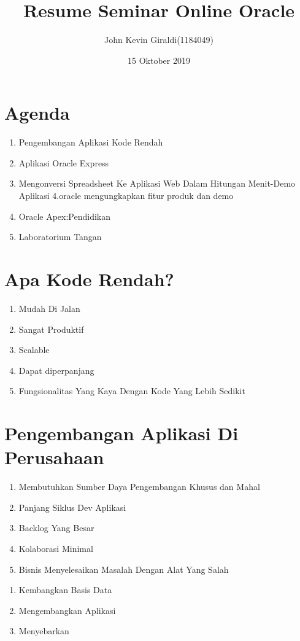 \documentclass{article}
\title{Resume Seminar Online Oracle}
\author{John Kevin Giraldi(1184049)}
\date{15 Oktober 2019}
\begin{document}
\maketitle

\section{Agenda}
\begin{enumerate}
    \item Pengembangan Aplikasi Kode Rendah 
    \item Aplikasi Oracle Express
    \item Mengonversi Spreadsheet Ke Aplikasi Web Dalam Hitungan Menit-Demo Aplikasi 4.oracle mengungkapkan fitur produk dan demo
    \item Oracle Apex:Pendidikan
    \item Laboratorium Tangan
\end{enumerate}

\section{Apa Kode Rendah?}
\begin{enumerate}
    \item Mudah Di Jalan
    \item Sangat Produktif
    \item Scalable
    \item Dapat diperpanjang
    \item Fungsionalitas Yang Kaya Dengan Kode Yang Lebih Sedikit
\end{enumerate}
\section{Pengembangan Aplikasi Di Perusahaan}
\begin{enumerate}
    \item Membutuhkan Sumber Daya Pengembangan Khusus dan Mahal
    \item Panjang Siklus Dev Aplikasi
    \item Backlog Yang Besar
    \item Kolaborasi Minimal
    \item Bisnis Menyelesaikan Masalah Dengan Alat Yang Salah
    
\end{enumerate}

\usepackage{Oracle Apex :}
\begin{enumerate}

    \item Kembangkan Basis Data
    \item Mengembangkan Aplikasi
    \item Menyebarkan
    
\end{enumerate}
\end{document}
